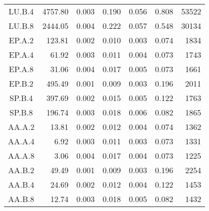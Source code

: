 \begin{threeparttable}
\begin{longtable}[c]{c*{6}{r}}
        LU.B.4                 & 4757.80                             & 0.003                               & 0.190          & 0.056 & 0.808 & 53522  \\
        LU.B.8                 & 2444.05                             & 0.004                               & 0.222          & 0.057 & 0.548 & 30134  \\
        EP.A.2                 & 123.81                              & 0.002                               & 0.010          & 0.003 & 0.074 & 1834   \\
        EP.A.4                 & 61.92                               & 0.003                               & 0.011          & 0.004 & 0.073 & 1743   \\
        EP.A.8                 & 31.06                               & 0.004                               & 0.017          & 0.005 & 0.073 & 1661   \\
        EP.B.2                 & 495.49                              & 0.001                               & 0.009          & 0.003 & 0.196 & 2011   \\
        SP.B.4                 & 397.69                              & 0.002                               & 0.015          & 0.005 & 0.122 & 1763   \\
        SP.B.8                 & 196.74                              & 0.003                               & 0.018          & 0.006 & 0.082 & 1865   \\
        AA.A.2                 & 13.81                               & 0.002                               & 0.012          & 0.004 & 0.074 & 1362   \\
        AA.A.4                 & 6.92                                & 0.003                               & 0.011          & 0.003 & 0.073 & 1331   \\
        AA.A.8                 & 3.06                                & 0.004                               & 0.017          & 0.004 & 0.073 & 1225   \\
        AA.B.2                 & 49.49                               & 0.001                               & 0.009          & 0.003 & 0.196 & 2254   \\
        AA.B.4                 & 24.69                               & 0.002                               & 0.012          & 0.004 & 0.122 & 1453   \\
        AA.B.8                 & 12.74                               & 0.003                               & 0.018          & 0.005 & 0.082 & 1432   \\

\end{longtable}
\end{threeparttable}
